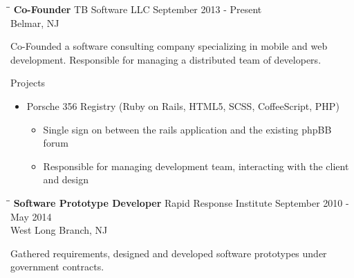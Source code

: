 \documentclass{res}
\begin{document}
\begin{resume}
   \begin{tabbing}
   \hspace{2.3in}\= \hspace{2.6in}\= \kill %
    {\bf Co-Founder} \>TB Software LLC     \>September 2013 - Present\\
                             \>Belmar, NJ
   \end{tabbing}\vspace{-20pt}      %
    Co-Founded a software consulting company specializing in mobile and web development. 
    Responsible for managing a distributed team of developers.

    Projects
    \begin{itemize}
        \item Porsche 356 Registry (Ruby on Rails, HTML5, SCSS, CoffeeScript, PHP)
        \begin{itemize}
            \item Single sign on between the rails application and the existing phpBB forum
            \item Responsible for managing development team, interacting with the client and design
        \end{itemize}
    \end{itemize}

   \begin{tabbing}
   \hspace{2.3in}\= \hspace{2.6in}\= \kill %
    {\bf Software Prototype Developer} \>Rapid Response Institute     \>September 2010 - May 2014\\
                             \>West Long Branch, NJ
   \end{tabbing}\vspace{-20pt}      %
   Gathered requirements, designed and developed software prototypes under government contracts.


\end{resume}
\end{document}
